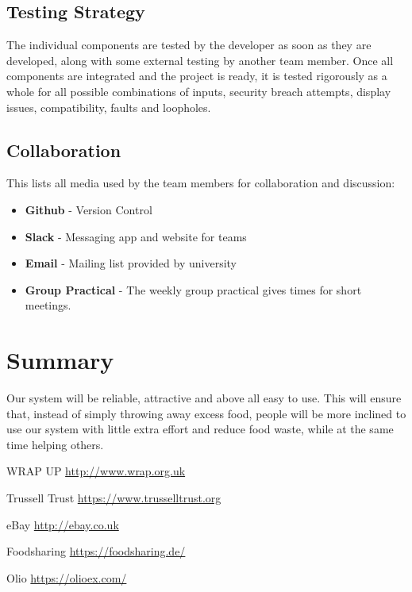 \documentclass[12pt]{article}
\begin{document}
\subsection{Testing Strategy}

The individual components are tested by the developer as soon as they are developed, along with some external testing by another team member. Once all components are integrated and the project is ready, it is tested rigorously as a whole for all possible combinations of inputs, security breach attempts, display issues, compatibility, faults and loopholes.

\subsection{Collaboration}

This lists all media used by the team members for collaboration and discussion:

\begin{itemize}

\item \textbf{Github} - Version Control 


\item \textbf{Slack} - Messaging app and website for teams


\item \textbf{Email} - Mailing list provided by university


\item \textbf{Group Practical} - The weekly group practical gives times for short meetings.

\end{itemize}

\section{Summary}

Our system will be reliable, attractive and above all easy to use. This will ensure that, instead of simply throwing away excess food, people will be more inclined to use our system with little extra effort and reduce food waste, while at the same time helping others. 

\begin{thebibliography}{1}

   WRAP UP  \href{http://www.wrap.org.uk/sites/files/wrap/Household_food_waste_in_the_UK_2015_Report.pdf}{http://www.wrap.org.uk}

   Trussell Trust \href{https://www.trusselltrust.org/2015/11/18/uk-foodbank-use-still-at-record-levels-as-hunger-remains-major-concern-for-low-income-families/}{https://www.trusselltrust.org}

   eBay \href{http://ebay.co.uk}{http://ebay.co.uk}

   Foodsharing \href{https://foodsharing.de/}{https://foodsharing.de/}

   Olio \href{https://olioex.com/}{https://olioex.com/}
\end{thebibliography}
\end{document}
